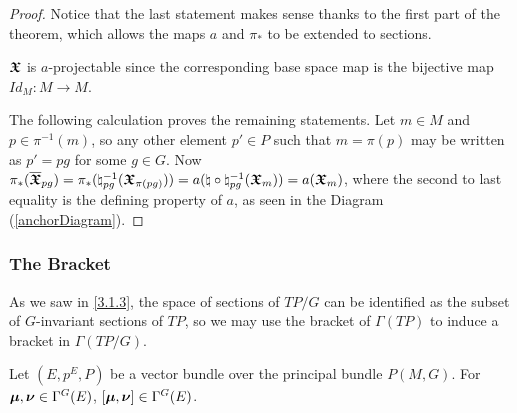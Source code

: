 \begin{proof}
Notice that the last statement makes sense thanks to the first part of the theorem, which allows the maps $a$ and $\pi_*$ to be extended to sections.%

$\bm{\mathfrak{X}}$ is $a$-projectable since the corresponding base space map is the bijective map $Id_M: M \to M$. 

The following calculation proves the remaining statements. Let $m \in M$ and $p \in \pi^{-1}(m)$, so any other element $p' \in P$ such that $m = \pi(p)$ may be written as $p' = pg$ for some $g \in G$. Now %
$\pi_*(\overline{\bm{\mathfrak{X}}}_{pg}) = \pi_*(\natural^{-1}_{pg}(\bm{\mathfrak{X}}_{\pi(pg)})) = a(\natural \circ \natural^{-1}_{pg}(\bm{\mathfrak{X}}_{m})) = a(\bm{\mathfrak{X}}_{m})$, where the second to last equality is the defining property of $a$, as seen in the Diagram (\ref{anchorDiagram}). 

\end{proof}

\subsubsection{The Bracket}

As we saw in \ref{3.1.3}, the space of sections of $TP/G$ can be identified as the subset of $G$-invariant sections of $TP$, so we may use the bracket of $\Gamma(TP)$ to induce a bracket in $\Gamma(TP/G)$.

\begin{proposition}
Let $(E, p^E, P)$ be a vector bundle over the principal bundle $P(M, G)$. For $\bm{\mu}, \bm{\nu} \in \Gamma^G(E)$, $[\bm{\mu}, \bm{\nu}] \in \Gamma^G(E)$.
\end{proposition}

